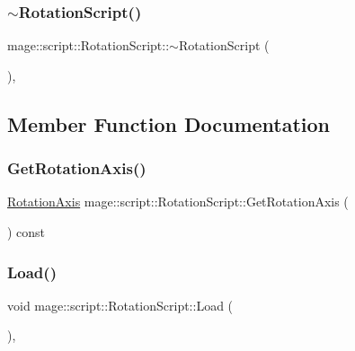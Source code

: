 \subsubsection{\texorpdfstring{$\sim$\+Rotation\+Script()}{~RotationScript()}}
{\footnotesize\ttfamily mage\+::script\+::\+Rotation\+Script\+::$\sim$\+Rotation\+Script (\begin{DoxyParamCaption}{ }\end{DoxyParamCaption})\hspace{0.3cm}{\ttfamily [virtual]}, {\ttfamily [default]}}



\subsection{Member Function Documentation}
\hypertarget{classmage_1_1script_1_1_rotation_script_ac2ef46249d59b379f47336eb250f3a28}{}\label{classmage_1_1script_1_1_rotation_script_ac2ef46249d59b379f47336eb250f3a28} 
\subsubsection{\texorpdfstring{Get\+Rotation\+Axis()}{GetRotationAxis()}}
{\footnotesize\ttfamily \hyperlink{classmage_1_1script_1_1_rotation_script_a54e1d1d0af65f43f5bc5ad65a4b9c00a}{Rotation\+Axis} mage\+::script\+::\+Rotation\+Script\+::\+Get\+Rotation\+Axis (\begin{DoxyParamCaption}{ }\end{DoxyParamCaption}) const\hspace{0.3cm}{\ttfamily [noexcept]}}

\hypertarget{classmage_1_1script_1_1_rotation_script_a7a632d323f57f4f2f19c0562bd0656e1}{}\label{classmage_1_1script_1_1_rotation_script_a7a632d323f57f4f2f19c0562bd0656e1} 
\subsubsection{\texorpdfstring{Load()}{Load()}}
{\footnotesize\ttfamily void mage\+::script\+::\+Rotation\+Script\+::\+Load (\begin{DoxyParamCaption}{ }\end{DoxyParamCaption})\hspace{0.3cm}{\ttfamily [override]}, {\ttfamily [virtual]}}

